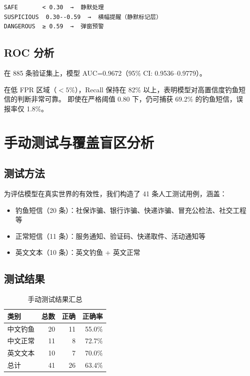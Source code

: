 \documentclass[11pt,a4paper]{article}
\begin{document}
\begin{Verbatim}[frame=single,fontsize=\small,label=RiskLevel 阈值定义（MlEngine.kt）]
SAFE       < 0.30  →  静默处理
SUSPICIOUS  0.30--0.59  →  横幅提醒（静默标记层）
DANGEROUS  ≥ 0.59  →  弹窗预警
\end{Verbatim}

\subsection{ROC 分析}

在 885 条验证集上，模型 AUC=0.9672（95\% CI: 0.9536--0.9779）。

在低 FPR 区域（$<5\%$），Recall 保持在 82\% 以上，表明模型对高置信度钓鱼短信的判断非常可靠。
即使在严格阈值 0.80 下，仍可捕获 69.2\% 的钓鱼短信，误报率仅 1.8\%。

\section{手动测试与覆盖盲区分析}

\subsection{测试方法}

为评估模型在真实世界的有效性，我们构造了 41 条人工测试用例，涵盖：

\begin{itemize}
  \item 钓鱼短信（20 条）：社保诈骗、银行诈骗、快递诈骗、冒充公检法、社交工程等
  \item 正常短信（11 条）：服务通知、验证码、快递取件、活动通知等
  \item 英文文本（10 条）：英文钓鱼 + 英文正常
\end{itemize}

\subsection{测试结果}

\begin{table}[H]
\centering
\caption{手动测试结果汇总}
\begin{tabular}{lrrr}
\toprule
类别 & 总数 & 正确 & 正确率 \\
\midrule
中文钓鱼 & 20 & 11 & 55.0\% \\
中文正常 & 11 & 8 & 72.7\% \\
英文文本 & 10 & 7 & 70.0\% \\
\midrule
总计 & 41 & 26 & 63.4\% \\
\bottomrule
\end{tabular}
\end{table}
\end{document}
